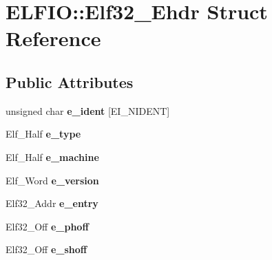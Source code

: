 \hypertarget{struct_e_l_f_i_o_1_1_elf32___ehdr}{}\section{E\+L\+F\+IO\+:\+:Elf32\+\_\+\+Ehdr Struct Reference}
\label{struct_e_l_f_i_o_1_1_elf32___ehdr}
\subsection*{Public Attributes}
\begin{DoxyCompactItemize}
\item 
unsigned char {\bfseries e\+\_\+ident} \mbox{[}E\+I\+\_\+\+N\+I\+D\+E\+NT\mbox{]}\hypertarget{struct_e_l_f_i_o_1_1_elf32___ehdr_aaa0327a449ee8d9830b52d848dfa2e3e}{}\label{struct_e_l_f_i_o_1_1_elf32___ehdr_aaa0327a449ee8d9830b52d848dfa2e3e}

\item 
Elf\+\_\+\+Half {\bfseries e\+\_\+type}\hypertarget{struct_e_l_f_i_o_1_1_elf32___ehdr_af6422855ccb1dff38804e03eaaa00483}{}\label{struct_e_l_f_i_o_1_1_elf32___ehdr_af6422855ccb1dff38804e03eaaa00483}

\item 
Elf\+\_\+\+Half {\bfseries e\+\_\+machine}\hypertarget{struct_e_l_f_i_o_1_1_elf32___ehdr_aa2db9e5ca0d904c4f04b25093f78c792}{}\label{struct_e_l_f_i_o_1_1_elf32___ehdr_aa2db9e5ca0d904c4f04b25093f78c792}

\item 
Elf\+\_\+\+Word {\bfseries e\+\_\+version}\hypertarget{struct_e_l_f_i_o_1_1_elf32___ehdr_a2e565340192731ab6bdb40964316f663}{}\label{struct_e_l_f_i_o_1_1_elf32___ehdr_a2e565340192731ab6bdb40964316f663}

\item 
Elf32\+\_\+\+Addr {\bfseries e\+\_\+entry}\hypertarget{struct_e_l_f_i_o_1_1_elf32___ehdr_a387d6d080b2d3c18fac4330556e6c228}{}\label{struct_e_l_f_i_o_1_1_elf32___ehdr_a387d6d080b2d3c18fac4330556e6c228}

\item 
Elf32\+\_\+\+Off {\bfseries e\+\_\+phoff}\hypertarget{struct_e_l_f_i_o_1_1_elf32___ehdr_ac91b83bce0252901d6935dc41119e883}{}\label{struct_e_l_f_i_o_1_1_elf32___ehdr_ac91b83bce0252901d6935dc41119e883}

\item 
Elf32\+\_\+\+Off {\bfseries e\+\_\+shoff}\hypertarget{struct_e_l_f_i_o_1_1_elf32___ehdr_a7621d4f398612c1e9f11b0aa05a892d3}{}\label{struct_e_l_f_i_o_1_1_elf32___ehdr_a7621d4f398612c1e9f11b0aa05a892d3}


\end{DoxyCompactItemize}
